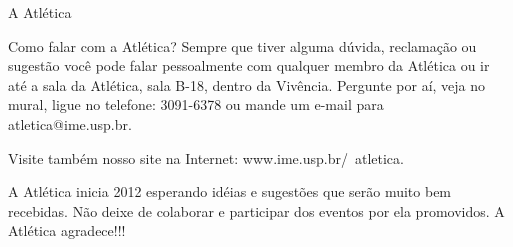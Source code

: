 \begin{secao}{A Atlética}
\begin{subsecao}{Como falar com a Atlética?}
    Sempre que tiver alguma dúvida, reclamação ou sugestão você pode falar pessoalmente com qualquer membro da Atlética ou ir até a sala da Atlética, sala B-18, dentro da Vivência. Pergunte por aí, veja no mural, ligue no telefone: 3091-6378 ou mande um e-mail para atletica@ime.usp.br.

    Visite também nosso site na Internet: www.ime.usp.br/~atletica. 

    A Atlética inicia 2012 esperando idéias e sugestões que serão muito bem recebidas. Não deixe de colaborar e participar dos eventos por ela promovidos. A Atlética agradece!!!

  \end{subsecao}
\end{secao}
